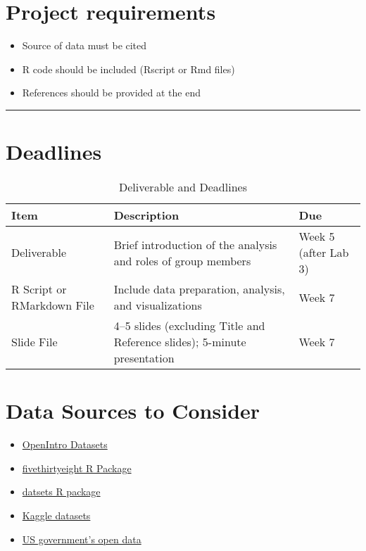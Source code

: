 \documentclass[11pt]{article}
\begin{document}
\section*{Project requirements}
\begin{itemize}
    \item Source of data must be cited
    \item R code should be included (Rscript or Rmd files)
    \item References should be provided at the end
\end{itemize}
\begin{center}\rule{16cm}{1pt}\end{center}

\section*{Deadlines}
\begin{table}[h!]
    \centering
    \begin{tabularx}{\textwidth}{|l|X|l|}
    \hline
    \textbf{Item} & \textbf{Description} & \textbf{Due} \\
    \hline
    Deliverable & Brief introduction of the analysis and roles of group members & Week 5 (after Lab 3) \\
    \hline
    R Script or RMarkdown File & Include data preparation, analysis, and visualizations & Week 7 \\
    \hline
    Slide File & 4–5 slides (excluding Title and Reference slides); 5-minute presentation & Week 7 \\
    \hline
    \end{tabularx}
    \caption{Deliverable and Deadlines}
\end{table}

\newpage
\section*{Data Sources to Consider}
\begin{itemize}
    \item \href{https://www.openintro.org/data/}{OpenIntro Datasets}
    \item \href{https://cran.r-project.org/web/packages/fivethirtyeight/vignettes/fivethirtyeight.html}{fivethirtyeight 
    R Package}
    \item \href{https://stat.ethz.ch/R-manual/R-devel/library/datasets/html/00Index.html}{datsets R package}
    \item \href{https://www.kaggle.com/datasets}{Kaggle datasets}
    \item \href{https://data.gov/}{US government's open data}
\end{itemize}
\end{document}
